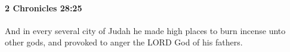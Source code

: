 
		\paragraph{2 Chronicles 28:25} %
			\label{2CHRONICLES-28-25}

			And in every several city of Judah he made high places to burn incense unto other gods, and provoked to anger the LORD God of his fathers.



